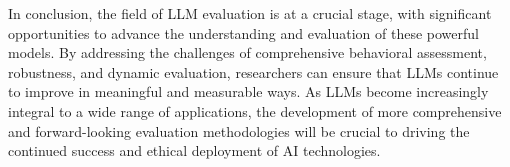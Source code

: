 In conclusion, the field of LLM evaluation is at a crucial stage, with significant opportunities to advance the understanding and evaluation of these powerful models. By addressing the challenges of comprehensive behavioral assessment, robustness, and dynamic evaluation, researchers can ensure that LLMs continue to improve in meaningful and measurable ways. As LLMs become increasingly integral to a wide range of applications, the development of more comprehensive and forward-looking evaluation methodologies will be crucial to driving the continued success and ethical deployment of AI technologies.

